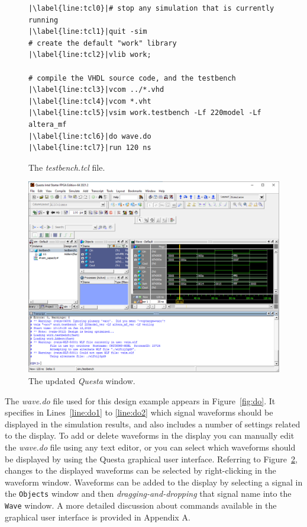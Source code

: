 \documentclass[11pt, twoside, pdftex]{article}
\begin{document}
\lstset{language=Tcl,numbers=left,escapechar=|}
\begin{figure}[h!]
\begin{center}
\begin{minipage}[t]{12.5 cm}
\begin{lstlisting}[name=tcl]
|\label{line:tcl0}|# stop any simulation that is currently running
|\label{line:tcl1}|quit -sim
# create the default "work" library
|\label{line:tcl2}|vlib work;

# compile the VHDL source code, and the testbench
|\label{line:tcl3}|vcom ../*.vhd
|\label{line:tcl4}|vcom *.vht
|\label{line:tcl5}|vsim work.testbench -Lf 220model -Lf altera_mf
|\label{line:tcl6}|do wave.do
|\label{line:tcl7}|run 120 ns
\end{lstlisting}
\end{minipage}
\caption{The {\it testbench.tcl} file.}
\label{fig:tcl}
\end{center}
\end{figure}
\begin{figure}[h!]
	\begin{center}
		\includegraphics[width = .85\textwidth]{figures/gui2.png}
	\end{center}
		  \caption{The updated {\it Questa} window.}
	\label{fig:gui2}
\end{figure}

The {\it wave.do} file used for this design example appears in Figure~\ref{fig:do}. 
It specifies in Lines~\ref{line:do1} to \ref{line:do2}
which signal waveforms should be displayed in the simulation results, and 
also includes a number of settings related to the display. To add or delete waveforms 
in the display you can manually edit the {\it wave.do} file using any text editor, 
or you can select which waveforms should be displayed by using the Questa graphical 
user interface. Referring to Figure~\ref{fig:gui2}, changes to the displayed waveforms 
can be selected by right-clicking in the waveform window. Waveforms can be added to 
the display by selecting a signal in the \texttt{Objects} window and then 
{\it dragging-and-dropping} that signal name into the \texttt{Wave} window. 
A more detailed discussion about commands
available in the graphical user interface is provided in Appendix A.
\end{document}
